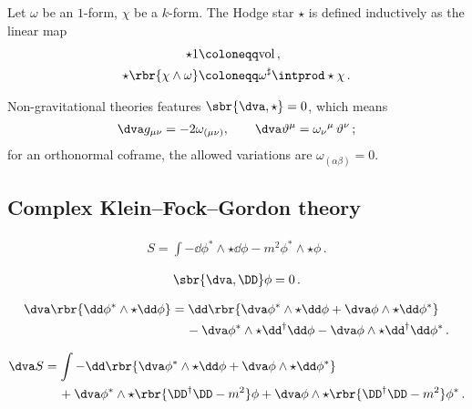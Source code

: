 \documentclass[a4paper]{article}
\begin{document}
Let $\omega$ be an $1$-form, $\chi$ be a $k$-form. The Hodge star
$\star$ is defined inductively as the linear map \cite[sec.\ 24]{Burke1985}
\begin{align}
\star 1 &\coloneqq \mathrm{vol}\,, \\
\star\rbr{\chi\wedge\omega} &\coloneqq \omega^{\sharp} \intprod \star\chi\,.
\label{eq:hodge-100}
\end{align}

Non-gravitational theories features $\sbr{\dva, \star} = 0$, which means
\cite[sec.\ 3.2]{Muench1998}
\begin{align}
\dva g_{\mu\nu} = -2\omega_{(\mu\nu)},\qquad 
\dva\vartheta^{\mu} = \omega_{\nu}{}^{\mu}\,\vartheta^{\nu}\,;
\end{align}
for an orthonormal coframe, the allowed variations are 
$\omega_{(\alpha\beta)} = 0$.

\subsection{Complex Klein--Fock--Gordon theory}
\begin{align}
S = \int -\dd\phi^*\wedge\star\dd\phi - m^2 \phi^*\wedge\star\phi\,.
\end{align}

\begin{align}
\sbr{\dva, \DD}\phi = 0\,.
\end{align}

\begin{align}
\begin{split}
\dva \rbr{\dd \phi^*\wedge\star\dd\phi} &= 
\dd\rbr{\dva\phi^*\wedge\star\dd\phi + \dva\phi\wedge\star\dd\phi^*}
\\
&\quad\,-
\dva\phi^*\wedge\star\dd^{\dagger}\dd\phi -
\dva\phi\wedge\star\dd^{\dagger}\dd\phi^*\,.
\end{split}
\end{align}

\begin{align}
\dva S &=
\int -\dd\rbr{\dva\phi^*\wedge\star\dd\phi +
\dva\phi\wedge\star\dd\phi^*}
\nonumber \\
&\quad\,+
\dva\phi^*\wedge\star\rbr{\DD^{\dagger}\DD-m^2}\phi +
\dva\phi\wedge\star\rbr{\DD^{\dagger}\DD-m^2}\phi^*\,.
\end{align}
\end{document}
